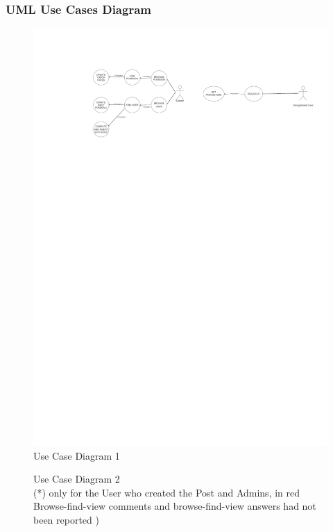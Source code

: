 \subsubsection{UML Use Cases Diagram}
\begin{figure}[H]
	\centering
	\includegraphics[width=\textwidth]{img/uml_use_case_2.pdf}
	\caption{Use Case Diagram 1}
\end{figure}



\begin{figure}[H]
	\caption{Use Case Diagram 2\\ (*) only for the User who created the Post and Admins, in red Browse-find-view comments and browse-find-view answers had not been reported )}
\end{figure}

